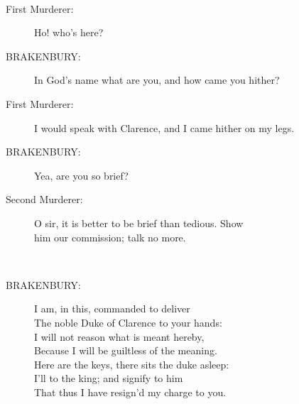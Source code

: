 \documentclass{article}
\begin{document}
\\
\begin{description}
\item[First Murderer:] 
\hspace{1pt}Ho! who's here?\\
\end{description}
\begin{description}
\item[BRAKENBURY:] 
\hspace{1pt}In God's name what are you, and how came you hither?\\
\end{description}
\begin{description}
\item[First Murderer:] 
\hspace{1pt}I would speak with Clarence, and I came hither on my legs.\\
\end{description}
\begin{description}
\item[BRAKENBURY:] 
\hspace{1pt}Yea, are you so brief?\\
\end{description}
\begin{description}
\item[Second Murderer:] 
\hspace{1pt}O sir, it is better to be brief than tedious. Show\\
\hspace{1pt}him our commission; talk no more.\\
\end{description}
\\
\begin{description}
\item[BRAKENBURY:] 
\hspace{1pt}I am, in this, commanded to deliver\\
\hspace{1pt}The noble Duke of Clarence to your hands:\\
\hspace{1pt}I will not reason what is meant hereby,\\
\hspace{1pt}Because I will be guiltless of the meaning.\\
\hspace{1pt}Here are the keys, there sits the duke asleep:\\
\hspace{1pt}I'll to the king; and signify to him\\
\hspace{1pt}That thus I have resign'd my charge to you.\\
\end{description}
\end{document}
